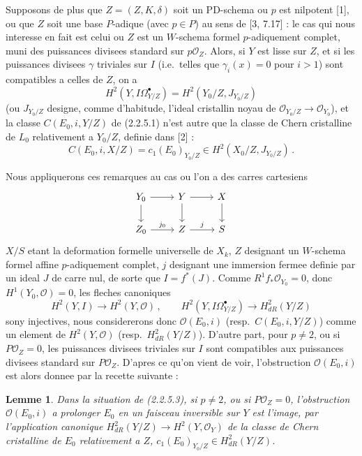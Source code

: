 \documentclass[12pt,a4paper]{article}
\theoremstyle{plain}
\newtheorem{lemma}[theorem]{Lemme}
\theoremstyle{definition}
\theoremstyle{remark}
\begin{document}
Supposons de plus que $Z = (Z, K, \delta)$ soit un PD-schema ou $p$ est nilpotent [1], ou que $Z$ soit une base $P$-adique (avec $p \in P$) au sens de [3, 7.17] : le cas qui nous interesse en fait est celui ou $Z$ est un $W$-schema formel $p$-adiquement complet, muni des puissances divisees standard sur $p\mathcal{O}_Z$. Alors, si $Y$ est lisse sur $Z$, et si les puissances divisees $\gamma$ triviales sur $I$ (i.e.\ telles que $\gamma_i(x) = 0$ pour $i > 1$) sont compatibles a celles de $Z$, on a
\[
H^2(Y, I\Omega_{Y/Z}^\bullet) = H^2(Y_0/Z, J_{Y_0/Z})
\]
(ou $J_{Y_0/Z}$ designe, comme d'habitude, l'ideal cristallin noyau de $\mathcal{O}_{Y_0/Z} \to \mathcal{O}_{Y_0}$), et la classe $C(E_0, i, Y/Z)$ de (2.2.5.1) n'est autre que la classe de Chern cristalline de $L_0$ relativement a $Y_0/Z$, definie dans [2] :
\begin{equation}\label{eq:2.2.5.2}
C(E_0, i, X/Z) = c_1(E_0)_{Y_0/Z} \in H^2(X_0/Z, J_{Y_0/Z})\,.\end{equation}

Nous appliquerons ces remarques au cas ou l'on a des carres cartesiens
\begin{equation}\label{eq:2.2.5.3}
\begin{tikzcd}
Y_0 \rar \dar & Y \rar \dar & X \dar \\
Z_0 \rar{j_0} & Z \rar{j} & S
\end{tikzcd}
\end{equation}
$X/S$ etant la deformation formelle universelle de $X_k$, $Z$ designant un $W$-schema formel affine $p$-adiquement complet, $j$ designant une immersion fermee definie par un ideal $J$ de carre nul, de sorte que $I = f^*(J)$. Comme $R^1f_*\mathcal{O}_{Y_0} = 0$, donc $H^1(Y_0, \mathcal{O}) = 0$, les fleches canoniques
\[
H^2(Y, I) \longrightarrow H^2(Y, \mathcal{O})\,, \qquad H^2(Y, I\Omega_{Y/Z}^\bullet) \longrightarrow H_{dR}^2(Y/Z)
\]
sony injectives, nous considererons donc $\mathcal{O}(E_0, i)$ (resp.\ $C(E_0, i, Y/Z)$) comme un element de $H^2(Y, \mathcal{O})$ (resp.\ $H_{dR}^2(Y/Z)$). D'autre part, pour $p \neq 2$, ou si $P\mathcal{O}_Z = 0$, les puissances divisees triviales sur $I$ sont compatibles aux puissances divisees standard sur $P\mathcal{O}_Z$. D'apres ce qu'on vient de voir, l'obstruction $\mathcal{O}(E_0, i)$ est alors donnee par la recette suivante :

\begin{lemma}\label{lem:2.2.6}
Dans la situation de (2.2.5.3), si $p \neq 2$, ou si $P\mathcal{O}_Z = 0$, l'obstruction $\mathcal{O}(E_0, i)$ a prolonger $E_0$ en un faisceau inversible sur $Y$ est l'image, par l'application canonique $H_{dR}^2(Y/Z) \to H^2(Y, \mathcal{O}_Y)$ de la classe de Chern cristalline de $E_0$ relativement a $Z$, $c_1(E_0)_{Y_0/Z} \in H_{dR}^2(Y/Z)$.
\end{lemma}
\end{document}
